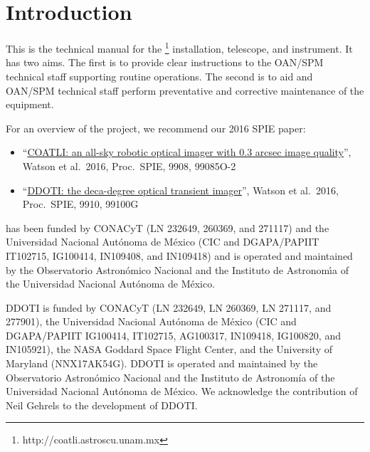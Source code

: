 \chapter{Introduction}
\label{chapter:introduction}

This is the technical manual for the {\projectname}\footnote{http://coatli.astroscu.unam.mx} installation, telescope, and instrument. It has two aims. The first is to provide clear instructions to the OAN/SPM technical staff supporting routine operations. The second is to aid {\projectname} and OAN/SPM technical staff perform preventative and corrective maintenance of the equipment.

For an overview of the {\projectname} project, we recommend our 2016 SPIE paper:

\ifcoatlioan
\begin{itemize}
\item “\href{bibliography/spie-coatli-2016.pdf}{COATLI: an all-sky robotic optical imager with 0.3 arcsec image quality}”,   Watson et al.\ 2016, Proc.\ SPIE, 9908, 99085O-2~\cite{Watson2016}
\end{itemize}
\fi

\ifddotioan
\begin{itemize}
\item “\href{bibliography/spie-ddoti-2016.pdf}{DDOTI: the deca-degree optical transient imager}”, Watson et al.\ 2016, Proc.\ SPIE, 9910, 99100G
\end{itemize}
\fi

\ifcoatlioan
{\projectname} has been funded by CONACyT (LN 232649, 260369, and 271117)
and the Universidad Nacional Aut\'onoma de M\'exico (CIC and
DGAPA/PAPIIT IT102715, IG100414, IN109408, and IN109418) and is operated and
maintained by the Observatorio Astron\'omico Nacional and the Instituto
de Astronom{\'\i}a of the Universidad Nacional Aut\'onoma de M\'exico.
\fi

\ifddotioan
DDOTI is funded by CONACyT (LN 232649, LN 260369, LN 271117, and 277901), the Universidad Nacional Autónoma de México (CIC and DGAPA/PAPIIT IG100414, IT102715, AG100317, IN109418, IG100820, and IN105921), the NASA Goddard Space Flight Center, and the University of Maryland (NNX17AK54G). DDOTI is operated and maintained by the Observatorio Astronómico Nacional and the Instituto de Astronomía of the Universidad Nacional Autónoma de México. We acknowledge the contribution of Neil Gehrels to the development of DDOTI.
\fi